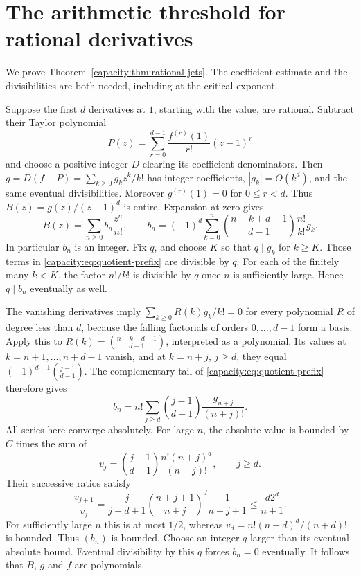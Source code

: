 \documentclass[11pt]{article}
\begin{document}
\section{The arithmetic threshold for rational derivatives}
\label{capacity:sec:rational-jets}
We prove Theorem~\ref{capacity:thm:rational-jets}. The coefficient estimate
and the divisibilities are both needed, including at the critical exponent.

Suppose the first $d$ derivatives at $1$, starting with the value, are rational.
Subtract their Taylor polynomial
\[
 P(z)=\sum_{r=0}^{d-1}\frac{f^{(r)}(1)}{r!}(z-1)^r
\]
and choose a positive integer $D$ clearing its coefficient denominators.
Then $g=D(f-P)=\sum_{k\ge0}g_kz^k/k!$ has integer coefficients,
$|g_k|=O(k^d)$, and the same eventual divisibilities. Moreover
$g^{(r)}(1)=0$ for $0\le r<d$. Thus $B(z)=g(z)/(z-1)^d$ is entire.
Expansion at zero gives
\[
 B(z)=\sum_{n\ge0}b_n\frac{z^n}{n!},\qquad
 b_n=(-1)^d\sum_{k=0}^n\binom{n-k+d-1}{d-1}\frac{n!}{k!}g_k.
 \tag{Q}\label{capacity:eq:quotient-prefix}
\]
In particular $b_n$ is an integer. Fix $q$, and choose $K$ so that
$q\mid g_k$ for $k\ge K$. Those terms in \eqref{capacity:eq:quotient-prefix}
are divisible by $q$. For each of the finitely many $k<K$, the factor
$n!/k!$ is divisible by $q$ once $n$ is sufficiently large. Hence
$q\mid b_n$ eventually as well.

The vanishing derivatives imply
$\sum_{k\ge0}R(k)g_k/k!=0$ for every polynomial $R$ of degree less than
$d$, because the falling factorials of orders $0,\ldots,d-1$ form a basis.
Apply this to $R(k)=\binom{n-k+d-1}{d-1}$, interpreted as a polynomial.
Its values at $k=n+1,\ldots,n+d-1$ vanish, and at $k=n+j$, $j\ge d$,
they equal $(-1)^{d-1}\binom{j-1}{d-1}$. The complementary tail of
\eqref{capacity:eq:quotient-prefix} therefore gives
\[
 b_n=n!\sum_{j\ge d}\binom{j-1}{d-1}\frac{g_{n+j}}{(n+j)!}.
 \tag{R}\label{capacity:eq:quotient-tail}
\]
All series here converge absolutely. For large $n$, the absolute value is
bounded by $C$ times the sum of
\[
 v_j=\binom{j-1}{d-1}\frac{n!(n+j)^d}{(n+j)!},\qquad j\ge d.
\]
Their successive ratios satisfy
\[
 \frac{v_{j+1}}{v_j}
 =\frac{j}{j-d+1}\left(\frac{n+j+1}{n+j}\right)^d\frac1{n+j+1}
 \le\frac{d2^d}{n+1}.
\]
For sufficiently large $n$ this is at most $1/2$, whereas
$v_d=n!(n+d)^d/(n+d)!$ is bounded. Thus $(b_n)$ is bounded.
Choose an integer $q$ larger than its eventual absolute bound. Eventual
divisibility by this $q$ forces $b_n=0$ eventually. It follows that $B$,
$g$ and $f$ are polynomials.
\end{document}
